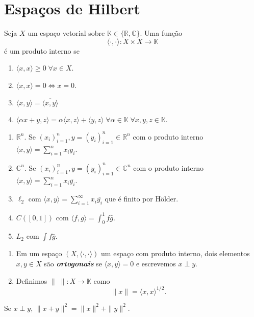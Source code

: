 \documentclass[portuguese]{article}
\theoremstyle{definition}
\newcommand{\R}{\mathbb{R}}
\newcommand{\C}{\mathbb{C}}
\begin{document}
\section{Espaços de Hilbert}
\begin{defn}
	Seja $X$ um espaço vetorial sobre $\mathbb{K}\in\{\R,\C\}$. Uma função
	\[\langle\cdot,\cdot\rangle:X\times X\to\mathbb{K}\]
	é um produto interno se
	\begin{enumerate}
		\item $\langle x,x\rangle\geq0\;\forall x\in X$.
		\item $\langle x,x\rangle=0\iff x=0$.
		\item $\langle x,y\rangle=\overline{\langle x,y\rangle}$
		\item $\langle\alpha x+y,z\rangle=\alpha\langle x,z\rangle+\langle y,z\rangle\;\forall\alpha\in\mathbb{K}\;\forall x,y,z\in\mathbb{K}$.
	\end{enumerate}
\end{defn}
\begin{exemplos}\leavevmode
	\begin{enumerate}
		\item $\R^n$. Se $(x_i)_{i=1}^n,y=(y_i)_{i=1}^n\in\R^n$ com o produto interno $\langle x,y\rangle=\sum_{i=1}^nx_iy_i$.
		\item $\C^n$. Se $(x_i)_{i=1}^n,y=(y_i)_{i=1}^n\in\C^n$ com o produto interno $\langle x,y\rangle=\sum_{i=1}^nx_i\overline{y_i}$.
		\item $\ell_2$ com $\langle x,y\rangle=\sum_{i=1}^\infty x_i\overline{y_i}$ que é finito por Hölder.
		\item $C([0,1])$ com $\langle f,g\rangle=\int_0^1f\bar{g}$.
		\item $L_2$ com $\int f\bar{g}$.
	\end{enumerate}
\end{exemplos}
\begin{defn}\leavevmode
	\begin{enumerate}
		\item Em um espaço $(X,\langle\cdot,\cdot\rangle)$ um espaço com produto interno, dois elementos $x,y\in X$ são \textbf{\textit{ortogonais}} se $\langle x,y\rangle=0$ e escrevemos $x\perp y$.
		\item Definimos $\|\;\|:X\to\mathbb{K}$ como
		\[\|x\|=\langle x,x\rangle^{1/2}.\]
	\end{enumerate}
\end{defn}
\begin{prop}[Pitágoras]
	Se $x\perp y$, $\|x+y\|^2=\|x\|^2+\|y\|^2$.
\end{prop}
\end{document}
